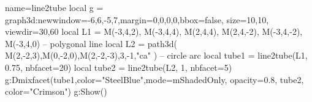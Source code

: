 \documentclass[border=5pt]{standalone}%
\begin{document}
\begin{luadraw}{name=line2tube}
local g = graph3d:new{window={-6,6,-5,7},margin={0,0,0,0},bbox=false, size={10,10}, viewdir={30,60}}
local L1 = {M(-3,4,2), M(-3,4,4), M(2,4,4), M(2,4,-2), M(-3,4,-2), M(-3,4,0)} -- polygonal line
local L2 = path3d( {M(2,-2,3),M(0,-2,0),M(2,-2,-3),3,-1,"ca"} ) -- circle arc
local tube1 = line2tube(L1, 0.75, {nbfacet=20})
local tube2 = line2tube(L2, 1, {nbfacet=5})
g:Dmixfacet(tube1,{color="SteelBlue",mode=mShadedOnly, opacity=0.8}, tube2, {color="Crimson"})
g:Show()
\end{luadraw}
\end{document}
